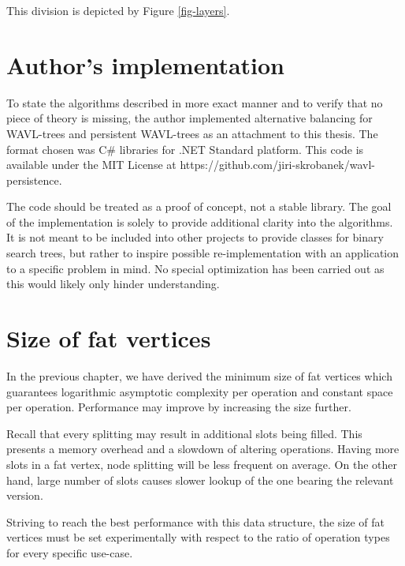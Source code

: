 This division is depicted by Figure \ref{fig-layers}.



\section{Author's implementation}

To state the algorithms described in more exact manner and to verify that no piece of theory is missing, the author implemented alternative balancing for WAVL-trees and persistent WAVL-trees as an attachment to this thesis. 
The format chosen was C\# libraries for .NET Standard platform. 
This code is available under the MIT License at\linebreak
{\ttfamily https://github.com/jiri-skrobanek/wavl-persistence}.

The code should be treated as a proof of concept, not a stable library. The goal of the implementation is solely to provide additional clarity into the algorithms. 
It is not meant to be included into other projects to provide classes for binary search trees, but rather to inspire possible re-implementation with an application to a specific problem in mind.
No special optimization has been carried out as this would likely only hinder understanding. 

\section{Size of fat vertices}

In the previous chapter, we have derived the minimum size of fat vertices which guarantees logarithmic asymptotic complexity per operation and constant space per operation. 
Performance may improve by increasing the size further.

Recall that every splitting may result in additional slots being filled. 
This presents a memory overhead and a slowdown of altering operations. 
Having more slots in a fat vertex, node splitting will be less frequent on average. 
On the other hand, large number of slots causes slower lookup of the one bearing the relevant version. 

Striving to reach the best performance with this data structure, the size of fat vertices must be set experimentally with respect to the ratio of operation types for every specific use-case.
